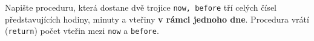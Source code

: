 \question[30]
Napište proceduru, která dostane dvě trojice \texttt{now, before} tří celých
čísel představujících hodiny, minuty a vteřiny \textbf{v rámci jednoho dne}.
Procedura vrátí (\texttt{return}) počet vteřin mezi \texttt{now} a
\texttt{before}.